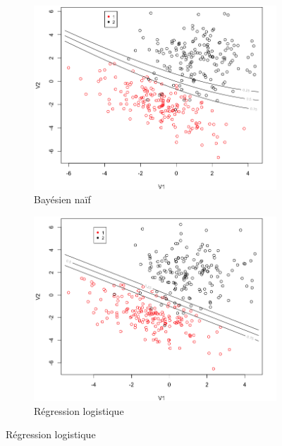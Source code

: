 \documentclass[a4paper,10pt]{report}
\begin{document}
\begin{figure}[H]
\begin{subfigure}[b]{0.45\linewidth}
	\end{subfigure}\\%
	\begin{subfigure}[b]{0.45\linewidth}
		\centering
		\captionsetup{justification=centering, margin=1cm}
		\includegraphics[width=1\linewidth]{img/front-decision-synth-1-nba}
		\caption{\small Bayésien naïf}
		\label{fig:front-decision-synth-1-nba}%
	\end{subfigure}%
	\begin{subfigure}[b]{0.45\linewidth}
		\centering
		\captionsetup{justification=centering, margin=1cm}
		\includegraphics[width=1\linewidth]{img/front-decision-synth-1-reg-log}
		\caption{\small Régression logistique}
		\label{fig:front-decision-synth-1-reg-log}%

\end{subfigure}
\end{figure}
\end{document}
